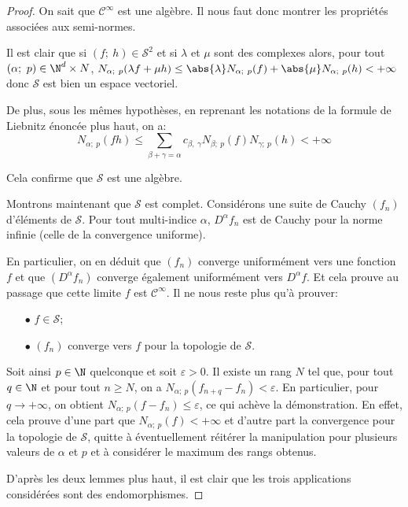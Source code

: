 \begin{proof}
On sait que $\mathcal{C}^{\infty}$ est une algèbre. Il nous faut donc montrer les propriétés associées aux semi-normes.

\medskip
Il est clair que si $(f;~h) \in \mathcal{S}^2$ et si $\lambda$ et $\mu$ sont des complexes alors, pour tout $(\alpha;~p) \in \N^d \times N$, $N_{\alpha;~p}(\lambda f + \mu h) \leq \abs{\lambda} N_{\alpha;~p}(f) + \abs{\mu} N_{\alpha;~p}(h) < +\infty$ donc $\mathcal{S}$ est bien un espace vectoriel.

\medskip
De plus, sous les mêmes hypothèses, en reprenant les notations de la formule de Liebnitz énoncée plus haut, on a:
\[
N_{\alpha;~p}(fh) \leq  \displaystyle{\sum \limits_{\beta + \gamma = \alpha}} c_{\beta,~\gamma} N_{\beta;~p} (f) N_{\gamma;~p} (h) < +\infty
\]

Cela confirme que $\mathcal{S}$ est une algèbre.

\medskip
Montrons maintenant que $\mathcal{S}$ est complet. Considérons une suite de Cauchy $(f_n)$ d'éléments de $\mathcal{S}$. Pour tout multi-indice $\alpha$, $D^{\alpha} f_n$ est de Cauchy pour la norme infinie (celle de la convergence uniforme).

En particulier, on en déduit que $(f_n)$ converge uniformément vers une fonction $f$ et que $\left (D^{\alpha} f_n\right )$ converge également uniformément vers $D^{\alpha} f$. Et cela prouve au passage que cette limite $f$ est $\mathcal{C}^{\infty}$. Il ne nous reste plus qu'à prouver:
\begin{itemize}
\item[$\bullet$] 
$f \in \mathcal{S}$;
\item[$\bullet$] 
$(f_n)$ converge vers $f$ pour la topologie de $\mathcal{S}$.
\end{itemize}

Soit ainsi $p \in \N$ quelconque et soit $\varepsilon >  0$. Il existe un rang $N$ tel que, pour tout $q \in \N$ et pour tout $n \geq N$, on a $N_{\alpha;~p} (f_{n+q} - f_n) < \varepsilon$. En particulier, pour $q \to +\infty$, on obtient $N_{\alpha;~p} (f - f_n) \leq \varepsilon$, ce qui achève la démonstration. En effet, cela prouve d'une part que  $N_{\alpha;~p} (f) < +\infty$ et d'autre part la convergence pour la topologie de $\mathcal{S}$, quitte à éventuellement réitérer la manipulation pour plusieurs valeurs de $\alpha$ et $p$ et à considérer le maximum des rangs obtenus.

\medskip
D'après les deux lemmes plus haut, il est clair que les trois applications considérées sont des endomorphismes. 


\end{proof}
